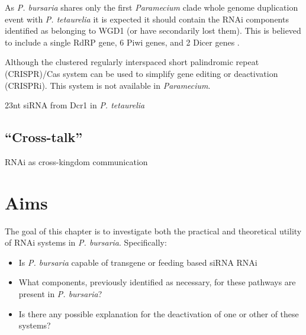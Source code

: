 As \textit{P. bursaria} shares only the first \textit{Paramecium} clade whole
genome duplication event with \textit{P. tetaurelia} it is expected
it should contain the RNAi components identified as belonging to WGD1 (or have 
secondarily lost them). 
This is believed to include a single RdRP gene, 6 Piwi genes, and 2 Dicer genes \citep{Marker2014}.
















































Although the clustered regularly interspaced short palindromic repeat (CRISPR)/Cas
system can be used to simplify gene editing or deactivation (CRISPRi).
This system is not available in \textit{Paramecium}.




23nt siRNA from Dcr1 in \textit{P. tetaurelia} \citep{Lepere2009}



\subsection{``Cross-talk''}


RNAi as cross-kingdom communication \citep{Weiberg2015}

\section{Aims}

The goal of this chapter is to investigate both the practical and
theoretical utility of RNAi systems in \textit{P. bursaria}. 
Specifically:
\begin{itemize}
    \item Is \textit{P. bursaria} capable of transgene
or feeding based siRNA RNAi
    \item What components, previously identified as necessary, for these pathways
        are present in \textit{P. bursaria}?
    \item Is there any possible explanation for the deactivation of one or other
        of these systems? 
\end{itemize}


